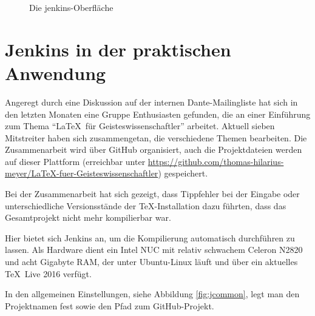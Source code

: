 \begin{figure}
\caption{Die jenkins-Oberfläche}\label{fig:NewJob}
\end{figure}

\section{Jenkins in der praktischen Anwendung}

Angeregt durch eine Diskussion auf der internen Dante-Mailingliste hat sich in den letzten Monaten eine Gruppe Enthusiasten gefunden, die an einer Einführung zum Thema \enquote{\LaTeX\ für Geisteswissenschaftler} arbeitet. Aktuell sieben Mitstreiter haben sich zusammengetan, die verschiedene Themen bearbeiten. Die Zusammenarbeit wird über GitHub organisiert, auch die Projektdateien werden auf dieser Plattform (erreichbar unter \url{https://github.com/thomas-hilarius-meyer/LaTeX-fuer-Geisteswissenschaftler}) gespeichert. 

Bei der Zusammenarbeit hat sich gezeigt, dass Tippfehler bei der Eingabe oder unterschiedliche Versionsstände der \TeX-Installation dazu führten, dass das Gesamtprojekt nicht mehr kompilierbar war. 

Hier bietet sich Jenkins an, um die Kompilierung automatisch durchführen zu lassen. Als Hardware dient ein Intel NUC mit relativ schwachem Celeron N2820 und acht Gigabyte RAM, der unter Ubuntu-Linux läuft und über ein aktuelles \TeX\ Live 2016 verfügt.

In den allgemeinen Einstellungen, siehe Abbildung \ref{fig:jcommon}, legt man den Projektnamen fest sowie den Pfad zum GitHub-Projekt.

